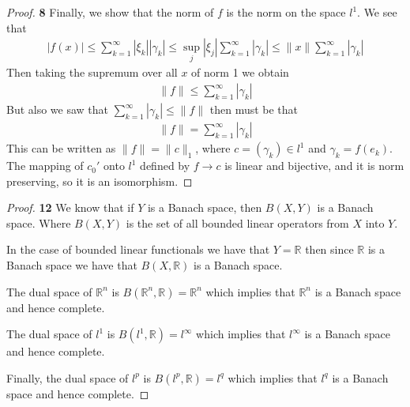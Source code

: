 \documentclass[11pt]{article}
\newcommand{\R}{\mathbb{R}}
\theoremstyle{definition}
\begin{document}
\begin{proof}{\textbf{8}}
    Finally, we show that the norm of $f$ is the norm on the space $l^1$.
    We see that
    \begin{align*}
        |f(x)|
        \leq \sum_{k=1}^\infty |\xi_{k}||\gamma_k|
        \leq \sup_j |\xi_j| \sum_{k=1}^\infty |\gamma_k|
        \leq \|x\| \sum_{k=1}^\infty |\gamma_k|
    \end{align*}
    Then taking the supremum over all $x$ of norm 1 we obtain
    \begin{align*}
        \|f\| \leq \sum_{k=1}^\infty |\gamma_k|
    \end{align*}
    But also we saw that $\sum_{k=1}^\infty |\gamma_k| \leq \|f\|$
    then must be that
    \begin{align*}
        \|f\| = \sum_{k=1}^\infty |\gamma_k|
    \end{align*}
    This can be written as $\|f\| = \|c\|_1$, where $c = (\gamma_k) \in l^1$
    and $\gamma_k = f(e_k)$.
    The mapping of $c_0'$ onto $l^1$ defined by $f \to c$ is linear and
    bijective, and it is norm preserving, so it is an isomorphism.
\end{proof}
\cleardoublepage
\begin{proof}{\textbf{12}}
    We know that if $Y$ is a Banach space, then $B(X,Y)$ is a Banach space.
    Where $B(X,Y)$ is the set of all bounded linear operators from $X$ into $Y$.
    
    In the case of bounded linear functionals we have that $Y = \R$ then since
    $\R$ is a Banach space we have that $B(X, \R)$ is a Banach space.
    
    The dual space of $\R^n$ is $B(\R^n, \R) = \R^n$ which implies that $\R^n$
    is a Banach space and hence complete.

    The dual space of $l^1$ is $B(l^1, \R) = l^\infty$ which implies that
    $l^\infty$ is a Banach space and hence complete.

    Finally, the dual space of $l^p$ is $B(l^p, \R) = l^q$ which implies that
    $l^q$ is a Banach space and hence complete.
\end{proof}
\end{document}
